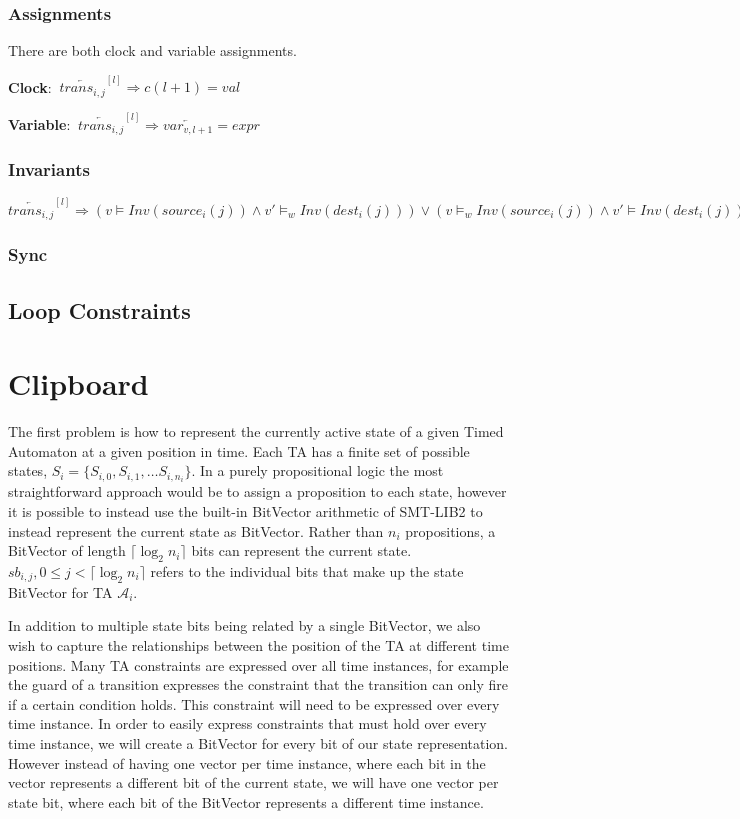 \documentclass[a4paper,11pt]{article}
\begin{document}
\subsubsection{Assignments}
\label{sec:org32f3337}

There are both clock and variable assignments.

\textbf{Clock}:
\(\ \overleftarrow{trans_{i,j}}^{[l]} \Rightarrow c(l+1) = val\)


\textbf{Variable}: \(\ \overleftarrow{trans_{i,j}}^{[l]} \Rightarrow \overleftarrow{var_{v,l+1}} = expr\)
\subsubsection{Invariants}
\label{sec:orgb235901}

\(\overleftarrow{trans_{i,j}}^{[l]} \Rightarrow (v \vDash Inv(source_i(j)) \land v'
\vDash_w Inv(dest_i(j))) \lor (v \vDash_w Inv(source_i(j)) \land v' \vDash Inv(dest_i(j)))\)

\subsubsection{Sync}
\label{sec:org5f94115}
\subsection{Loop Constraints}
\label{sec:orgb596003}

\section{Clipboard}
\label{sec:org0d86c56}
The first problem is how to represent the currently active state of a given
Timed Automaton at a given position in time. Each TA has a finite set of
possible states, \(S_i = \{S_{i,0}, S_{i,1}, \ldots S_{i,n_i}\}\). In a purely
propositional logic the most straightforward approach would be to assign a
proposition to each state, however it is possible to instead use the built-in
BitVector arithmetic of SMT-LIB2 to instead represent the current state as
BitVector. Rather than \(n_i\) propositions, a BitVector of length
\(\lceil \log_2 n_i \rceil\) bits can represent the current state.
\(sb_{i,j}, 0 \leq j < \lceil \log_2 n_i \rceil\) refers to the individual
bits that make up the state BitVector for TA \(\mathcal{A}_i\).

In addition to multiple state bits being related by a single BitVector, we also
wish to capture the relationships between the position of the TA at different
time positions. Many TA constraints are expressed over all time instances, for
example the guard of a transition expresses the constraint that the transition
can only fire if a certain condition holds. This constraint will need to be
expressed over every time instance. In order to easily express constraints that
must hold over every time instance, we will create a BitVector for every bit of
our state representation. However instead of having one vector per time
instance, where each bit in the vector represents a different bit of the current
state, we will have one vector per state bit, where each bit of the BitVector
represents a different time instance.
\end{document}
